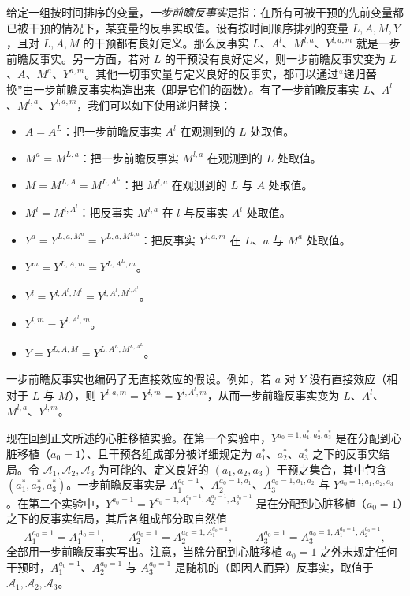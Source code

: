 \renewcommand{\TPname}{技术注记（Technical Point）}
\begin{techpoint}[递归替换]
给定一组按时间排序的变量，\emph{一步前瞻反事实}是指：在所有可被干预的先前变量都已被干预的情况下，某变量的反事实取值。设有按时间顺序排列的变量 $L,A,M,Y$，且对 $L,A,M$ 的干预都有良好定义。那么反事实 $L$、$A^{l}$、$M^{l,a}$、$Y^{l,a,m}$ 就是一步前瞻反事实。另一方面，若对 $L$ 的干预没有良好定义，则一步前瞻反事实变为 $L$、$A$、$M^{a}$、$Y^{a,m}$。其他一切事实量与定义良好的反事实，都可以通过“递归替换”由一步前瞻反事实构造出来（即是它们的函数）。有了一步前瞻反事实 $L$、$A^{l}$、$M^{l,a}$、$Y^{l,a,m}$，我们可以如下使用递归替换：

\begin{itemize}
\item $A=A^{L}$：把一步前瞻反事实 $A^{l}$ 在观测到的 $L$ 处取值。
\item $M^{a}=M^{L,a}$：把一步前瞻反事实 $M^{l,a}$ 在观测到的 $L$ 处取值。
\item $M=M^{L,A}=M^{L,A^{L}}$：把 $M^{l,a}$ 在观测到的 $L$ 与 $A$ 处取值。
\item $M^{l}=M^{l,A^{l}}$：把反事实 $M^{l,a}$ 在 $l$ 与反事实 $A^{l}$ 处取值。
\item $Y^{a}=Y^{L,a,M^{a}}=Y^{L,a,M^{L,a}}$：把反事实 $Y^{l,a,m}$ 在 $L$、$a$ 与 $M^{a}$ 处取值。
\item $Y^{m}=Y^{L,A,m}=Y^{L,A^{L},m}$。
\item $Y^{l}=Y^{l,A^{l},M^{l}}=Y^{l,A^{l},M^{l,A^{l}}}$。
\item $Y^{l,m}=Y^{l,A^{l},m}$。
\item $Y=Y^{L,A,M}=Y^{L,A^{L},M^{L,A^{L}}}$。
\end{itemize}

一步前瞻反事实也编码了无直接效应的假设。例如，若 $a$ 对 $Y$ 没有直接效应（相对于 $L$ 与 $M$），则 $Y^{l,a,m}=Y^{l,m}=Y^{l,A^{l},m}$，从而一步前瞻反事实变为 $L$、$A^{l}$、$M^{l,a}$、$Y^{l,m}$。

现在回到正文所述的心脏移植实验。在第一个实验中，\mbox{$Y^{a_0=1,a_1^{*},a_2^{*},a_3^{*}}$} 是在分配到心脏移植（$a_0=1$）、且干预各组成部分被详细规定为 $a_1^{*}$、$a_2^{*}$、$a_3^{*}$ 之下的反事实结局。令 $\mathcal{A}_1,\mathcal{A}_2,\mathcal{A}_3$ 为可能的、定义良好的 $(a_1,a_2,a_3)$ 干预之集合，其中包含 $(a_1^{*},a_2^{*},a_3^{*})$。一步前瞻反事实是 $A_1^{a_0=1}$、$A_2^{a_0=1,a_1}$、$A_3^{a_0=1,a_1,a_2}$ 与 $Y^{a_0=1,a_1,a_2,a_3}$。在第二个实验中，\mbox{$Y^{a_0=1}=Y^{a_0=1,A_1^{a_0=1},A_2^{a_0=1},A_3^{a_0=1}}$} 是在分配到心脏移植（$a_0=1$）之下的反事实结局，其后各组成部分取自然值
\[
A_1^{a_0=1}=A_1^{A_0=1},\qquad
A_2^{a_0=1}=A_2^{a_0=1,A_1^{a_0=1}},\qquad
A_3^{a_0=1}=A_3^{a_0=1,A_1^{a_0=1},A_2^{a_0=1}},
\]
全部用一步前瞻反事实写出。注意，当除分配到心脏移植 $a_0=1$ 之外未规定任何干预时，$A_1^{a_0=1}$、$A_2^{a_0=1}$ 与 $A_3^{a_0=1}$ 是随机的（即因人而异）反事实，取值于 $\mathcal{A}_1,\mathcal{A}_2,\mathcal{A}_3$。


\end{techpoint}
